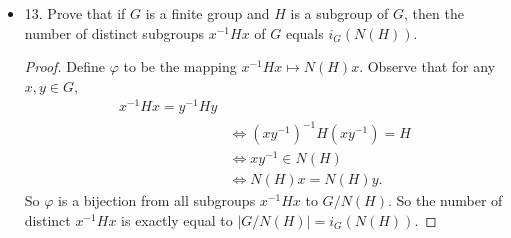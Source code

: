 \begin{itemize}[resume]
\begin{proof}
	To see $H \subset N(H)$, note that for any  $h \in H$, $hH = H = Hh$.

	To see that $H \triangleleft  N(H)$, take any element $n \in N(H)$, and we want to show $n H = H n$. But this directly follows from definition of $N(H)$.
\end{proof}

	\item 13. Prove that if $G$ is a finite group and $H$ is a subgroup of $G$, then the number of distinct subgroups $x^{-1} H x$ of $G$ equals $i_G(N(H))$.
\begin{proof}
	Define $\varphi$ to be the mapping $x^{-1} H x \mapsto N(H) x$.
	Observe that for any $x, y \in G$,
	\begin{align*}
		x^{-1} H x  = y^{-1} H y \\
		&\iff (xy^{-1} )^{-1} H (xy^{-1} ) = H \\
		&\iff xy^{-1} \in N(H) \\
		&\iff N(H) x = N(H)y
	.\end{align*}
	So $\varphi$ is a bijection from all subgroups $x^{-1} H x$ to $G / N(H)$. So the number of distinct $x^{-1} H x$ is exactly equal to $|G / N(H)| = i_G(N(H))$.
\end{proof}

\end{itemize}

